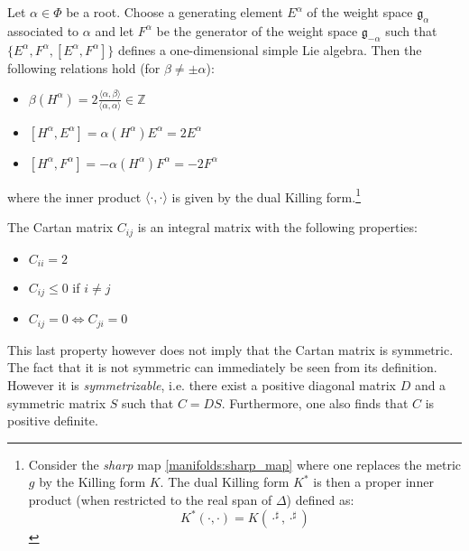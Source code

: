         \begin{property}
        	Let $\alpha\in\Phi$ be a root. Choose a generating element $E^\alpha$ of the weight space $\mathfrak{g}_\alpha$ associated to $\alpha$ and let $F^\alpha$ be the generator of the weight space $\mathfrak{g}_{-\alpha}$ such that $\{E^\alpha, F^\alpha, [E^\alpha, F^\alpha]\}$ defines a one-dimensional simple Lie algebra. Then the following relations hold (for $\beta\neq\pm\alpha$):
        	\begin{itemize}
        		\item $\beta(H^\alpha) = 2\frac{\langle\alpha, \beta\rangle}{\langle\alpha, \alpha\rangle}\in\mathbb{Z}$
        		\item $[H^\alpha, E^\alpha] = \alpha(H^\alpha)E^\alpha = 2E^\alpha$
        		\item $[H^\alpha, F^\alpha] = -\alpha(H^\alpha)F^\alpha = -2F^\alpha$
        	\end{itemize}
        	where the inner product $\langle\cdot,\cdot\rangle$ is given by the dual Killing form.\footnote{Consider the \textit{sharp} map \ref{manifolds:sharp_map} where one replaces the metric $g$ by the Killing form $K$. The dual Killing form $K^*$ is then a proper inner product (when restricted to the real span of $\Delta$) defined as: \[K^*(\cdot, \cdot) = K(\cdot^\sharp, \cdot^\sharp)\]}
        \end{property}

        \begin{property}\label{lie:cartan_prop}
        	The Cartan matrix $C_{ij}$ is an integral matrix with the following properties:
        	\begin{itemize}
        		\item $C_{ii} = 2$
        		\item $C_{ij} \leq 0$ if $i\neq j$
        		\item $C_{ij} = 0\iff C_{ji} = 0$
        	\end{itemize}
        	This last property however does not imply that the Cartan matrix is symmetric. The fact that it is not symmetric can immediately be seen from its definition. However it is \textit{symmetrizable}, i.e. there exist a positive diagonal matrix $D$ and a symmetric matrix $S$ such that $C = DS$. Furthermore, one also finds that $C$ is positive definite.
        \end{property}
        
